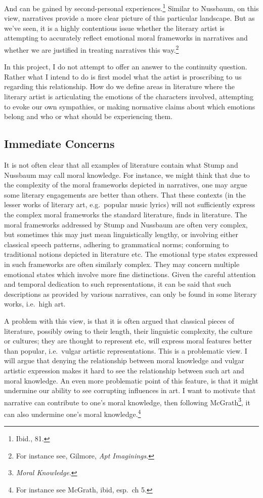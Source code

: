 \documentclass[phdthesis,12pt,final]{wuthesis}
\theoremstyle{definition}
\theoremstyle{definition}
\theoremstyle{definition}
\theoremstyle{definition}
\theoremstyle{remark}
\begin{document}
\noindent And can be gained by second-personal experiences.\footnote{Ibid., 81.} Similar to Nussbaum, on this view, narratives provide a more clear picture of this particular landscape. But as we've seen, it is a highly contentious issue whether the literary artist is attempting to accurately reflect emotional moral frameworks in narratives and whether we are justified in treating narratives this way.\footnote{For instance see, Gilmore, \emph{Apt {Imaginings}}.}

\noindent In this project, I do not attempt to offer an answer to the continuity question. Rather what I intend to do is first model what the artist is proscribing to us regarding this relationship. How do we define areas in literature where the literary artist is articulating the emotions of the characters involved, attempting to evoke our own sympathies, or making normative claims about which emotions belong and who or what should be experiencing them.

\subsection*{Immediate Concerns}\label{immediate-concerns}

It is not often clear that all examples of literature contain what Stump and Nussbaum may call moral knowledge. For instance, we might think that due to the complexity of the moral frameworks depicted in narratives, one may argue some literary engagements are better than others. That these contexts (in the lesser works of literary art, e.g.~popular music lyrics) will not sufficiently express the complex moral frameworks the standard literature, finds in literature. The moral frameworks addressed by Stump and Nussbaum are often very complex, but sometimes this may just mean linguistically lengthy, or involving either classical speech patterns, adhering to grammatical norms; conforming to traditional notions depicted in literature etc. The emotional type states expressed in such frameworks are often similarly complex. They may concern multiple emotional states which involve more fine distinctions. Given the careful attention and temporal dedication to such representations, it can be said that such descriptions as provided by various narratives, can only be found in some literary works, i.e.~high art.

A problem with this view, is that it is often argued that classical pieces of literature, possibly owing to their length, their linguistic complexity, the culture or cultures; they are thought to represent etc, will express moral features better than popular, i.e.~vulgar artistic representations. This is a problematic view. I will argue that denying the relationship between moral knowledge and vulgar artistic expression makes it hard to see the relationship between such art and moral knowledge. An even more problematic point of this feature, is that it might undermine our ability to see corrupting influences in art. I want to motivate that narrative can contribute to one's moral knowledge, then following McGrath\footnote{\emph{Moral {Knowledge}}.}, it can also undermine one's moral knowledge.\footnote{For instance see McGrath, ibid, esp.~ch 5.}
\end{document}
